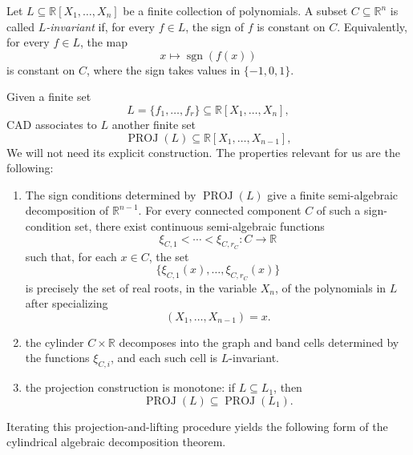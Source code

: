 \documentclass[11pt]{article}
\theoremstyle{remark}
\newcommand{\1}{\mathbf 1}
\begin{document}
Let \(L\subseteq \mathbb{R}[X_1,\ldots,X_n]\) be a finite collection of
polynomials.  A subset \(C\subseteq \mathbb{R}^n\) is called
\emph{\(L\)-invariant} if, for every \(f\in L\), the sign of \(f\) is constant
on \(C\).  Equivalently, for every \(f\in L\), the map
\[
  x\longmapsto \operatorname{sgn}(f(x))
\]
is constant on \(C\), where the sign takes values in \(\{-1,0,1\}\).

Given a finite set
\[
  L=\{f_1,\ldots,f_r\}\subseteq \mathbb{R}[X_1,\ldots,X_n],
\]
CAD associates to \(L\) another finite set
\[
  \operatorname{PROJ}(L)\subseteq \mathbb{R}[X_1,\ldots,X_{n-1}],
\]
We will not need its explicit construction.  The
properties relevant for us are the following:
\begin{enumerate}

\item The sign conditions determined by \(\operatorname{PROJ}(L)\) give a
finite semi-algebraic decomposition of \(\mathbb{R}^{n-1}\).  For every
connected component \(C\) of such a sign-condition set, there exist continuous
semi-algebraic functions
\[
  \xi_{C,1}<\cdots<\xi_{C,r_C}:C\longrightarrow \mathbb{R}
\]
such that, for each \(x\in C\), the set
\[
  \{\xi_{C,1}(x),\ldots,\xi_{C,r_C}(x)\}
\]
is precisely the set of real roots, in the variable \(X_n\), of the polynomials
in \(L\) after specializing
\[
  (X_1,\ldots,X_{n-1})=x.
\]
\item the cylinder \(C\times \mathbb{R}\) decomposes into the graph and band
cells determined by the functions \(\xi_{C,i}\), and each such cell is
\(L\)-invariant.  
\item the projection construction is monotone: if
\(L\subseteq L_1\), then
\[
  \operatorname{PROJ}(L)\subseteq \operatorname{PROJ}(L_1).
\]
\end{enumerate}

Iterating this projection-and-lifting procedure yields the following form of
the cylindrical algebraic decomposition theorem.
\end{document}
